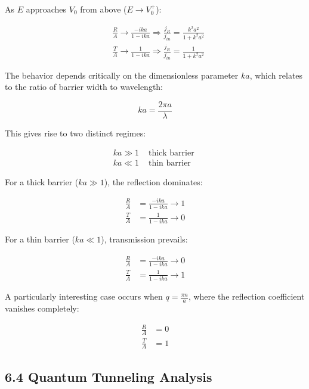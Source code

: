 \documentclass[italian]{HKNdocument}
\begin{document}
As $E$ approaches $V_0$ from above ($E \rightarrow V_0^+$):

\begin{align*}
& \frac{R}{A} \rightarrow \frac{-i k a}{1-i k a} \Longrightarrow \frac{j_{R}}{j_{i n}}=\frac{k^{2} a^{2}}{1+k^{2} a^{2}}  \tag{6.67}\\
& \frac{T}{A} \rightarrow \frac{1}{1-i k a} \Longrightarrow \frac{j_{R}}{j_{i n}}=\frac{1}{1+k^{2} a^{2}}
\end{align*}

The behavior depends critically on the dimensionless parameter $ka$, which relates to the ratio of barrier width to wavelength:

\begin{equation*}
k a=\frac{2 \pi a}{\lambda} \tag{6.68}
\end{equation*}

This gives rise to two distinct regimes:

\[
\begin{array}{ll}
k a \gg 1 & \text { thick barrier } \\
k a \ll 1 & \text { thin barrier } \tag{6.69}
\end{array}
\]

For a thick barrier ($ka \gg 1$), the reflection dominates:

\begin{align*}
\frac{R}{A} & =\frac{-i k a}{1-i k a} \rightarrow 1 \\
\frac{T}{A} & =\frac{1}{1-i k a} \rightarrow 0 \tag{6.70}
\end{align*}

For a thin barrier ($ka \ll 1$), transmission prevails:

\begin{align*}
\frac{R}{A} & =\frac{-i k a}{1-i k a} \rightarrow 0 \\
\frac{T}{A} & =\frac{1}{1-i k a} \rightarrow 1 \tag{6.71}
\end{align*}

A particularly interesting case occurs when $q=\frac{\pi n}{a}$, where the reflection coefficient vanishes completely:

\begin{align*}
\frac{R}{A} & =0 \\
\frac{T}{A} & =1 \tag{6.72}
\end{align*}


\subsection*{6.4 Quantum Tunneling Analysis}
\end{document}
